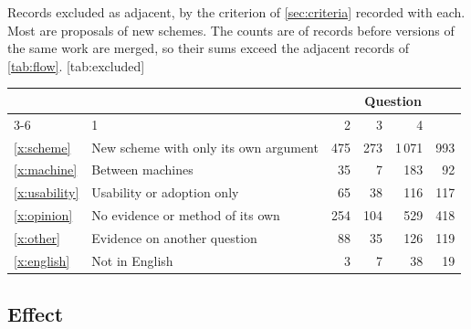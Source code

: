 \begin{table}
  \begin{sidecaption}{%
    Records excluded as adjacent, by the criterion of
    \cref{sec:criteria} recorded with each.
    Most are proposals of new schemes.
    The counts are of records before versions of the same work are
    merged, so their sums exceed the adjacent records of
    \cref{tab:flow}.
  }[tab:excluded]
    \footnotesize
    \begin{tabular}{@{}llrrrr@{}}
      \toprule
      & & \multicolumn{4}{c}{Question} \\
      \cmidrule(l){3-6}
      \multicolumn{2}{@{}l}{Criterion} & 1 & 2 & 3 & 4 \\
      \midrule
      \ref{x:scheme} & New scheme with only its own argument & 475 & 273 & 1\,071 & 993 \\
      \ref{x:machine} & Between machines & 35 & 7 & 183 & 92 \\
      \ref{x:usability} & Usability or adoption only & 65 & 38 & 116 & 117 \\
      \ref{x:opinion} & No evidence or method of its own & 254 & 104 & 529 & 418 \\
      \ref{x:other} & Evidence on another question & 88 & 35 & 126 & 119 \\
      \ref{x:english} & Not in English & 3 & 7 & 38 & 19 \\
      \bottomrule
    \end{tabular}
  \end{sidecaption}
\end{table}

\subsection{Effect}\label{sec:res-effect}

